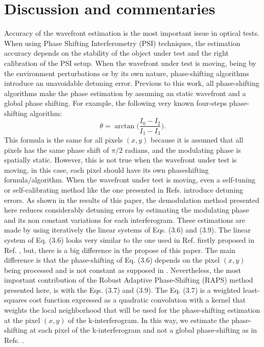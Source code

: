 \section{Discussion and commentaries}

Accuracy of the wavefront estimation is the most important issue in optical
tests. When using Phase Shifting Interferometry (PSI) techniques, the estimation
accuracy depends on the stability of the object under test and the right
calibration of the PSI setup. When the wavefront under test is moving, being by
the environment perturbations or by its own nature, phase-shifting algorithms
introduce an unavoidable detuning error. Previous to this work, all
phase-shifting algorithms make the phase estimation by assuming an static
wavefront and a global phase shifting. For example, the following very known
four-steps phase-shifting algorithm:
\begin{equation}
 \theta = \arctan \Bigg( \frac{I_0-I_2}{I_1-I_3} \Bigg).
\end{equation}
This formula is the same for all pixels $(x,y)$ because it is assumed that all
pixels has the same phase shift of $\pi/2$ radians, and the modulating phase is
spatially static. However, this is not true when the wavefront under test is
moving, in this case, each pixel should have its own phaseshifting
formula/algorithm. When the wavefront under test is moving, even a self-tuning
or self-calibrating method like the one presented in
Refs.\cite{Xu:06,Wang:04,Estrada:10} introduce detuning errors. As
shown in the results of this paper, the demodulation method presented here
reduces considerably detuning errors by estimating the modulating phase and its
non constant variations for each interferogram. These estimations are made by
using iteratively the linear systems of Eqs. (3.6) and (3.9). The linear system
of Eq. (3.6) looks very similar to the one used in Ref. \cite{Wang:04}
firstly proposed in Ref. \cite{Morgan}, but, there is a big difference in the
propose of this paper. The main difference is that the phase-shifting of Eq.
(3.6) depends on the pixel $(x,y)$ being processed and
is not constant as supposed in \cite{Wang:04}. Nevertheless, the most
important contribution of the Robust Adaptive Phase-Shifting (RAPS) method
presented here, is with the Eqs. (3.7) and (3.9). The Eq. (3.7) is a weighted
least-squares cost function expressed as a quadratic convolution with a kernel
that weights the local neighborhood that will be used for the phase-shifting
estimation at the pixel $(x,y)$ of the k-interferogram. In this way, we estimate
the phase-shifting at each pixel of the k-interferogram and not a global
phase-shifting as in Refs. \cite{Xu:06,Wang:04}.

